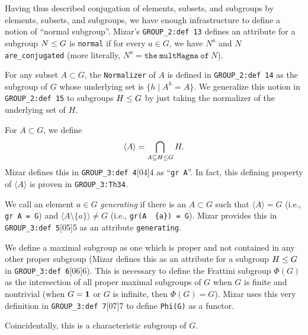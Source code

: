 Having thus described conjugation of elements, subsets, and subgroups by
elements, subsets, and subgroups, we have enough infrastructure to
define a notion of ``normal subgroup''. Mizar's
\verb#GROUP_2:def 13# defines an attribute for a subgroup
$N\leq G$ is \verb#normal# if for
every $a\in G$, we have $N^{a}$ and $N$ \verb#are_conjugated# (more
literally, $N^{a} = \mathtt{the~multMagma~of~}N$).

For any subset $A\subset G$, the \verb#Normalizer# of $A$ is defined in
\verb#GROUP_2:def 14# as the subgroup of $G$ whose
underlying set is $\{h \mid A^{h} = A\}$. We generalize this notion in
\verb#GROUP_2:def 15# to subgroups $H\leq G$ by just taking the
normalizer of the underlying set of $H$.

For $A\subset G$, we define
\begin{equation}
\langle A\rangle = \bigcap_{A\subseteq H\leq G} H.
\end{equation}
Mizar defines this in \verb#GROUP_3:def 4#[04]{4} as
``\verb#gr A#''. In fact, this defining
property of $\langle A\rangle$ is proven in
\verb#GROUP_3:Th34#.

We call an element $a\in G$ \emph{generating} if there is an $A\subset G$
such that $\langle A\rangle = G$ (i.e., \texttt{gr A = G}) and
$\langle A\setminus\{a\}\rangle\neq G$ (i.e., \texttt{gr(A \ \{a\}) = G}).
Mizar provides this in \verb#GROUP_3:def 5#[05]{5} as
an attribute \verb#generating#.

We define a maximal subgroup as one which is proper and not contained in
any other proper subgroup (Mizar defines this as an attribute for a
subgroup $H\leq G$ in \verb#GROUP_3:def 6#[06]{6}).
This is necessary to define the Frattini subgroup $\Phi(G)$ as the
intersection of all proper maximal subgroups of $G$ when $G$ is finite
and nontrivial (when $G=\mathbf{1}$ or $G$ is infinite, then
$\Phi(G)=G$). Mizar uses this very definition in
\verb#GROUP_3:def 7#[07]{7} to define \texttt{Phi(G)}
as a functor.

Coincidentally, this is a characteristic subgroup of $G$.
